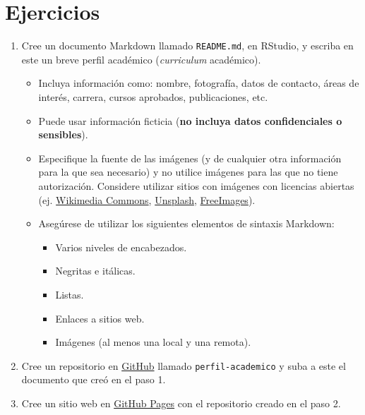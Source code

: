\documentclass[
  letterpaper,
  DIV=11,
  numbers=noendperiod]{scrreprt}
\providecommand{\tightlist}{%
  \setlength{\itemsep}{0pt}\setlength{\parskip}{0pt}}\usepackage{longtable,booktabs,array}
\begin{document}
\hypertarget{ejercicios}{%
\section{Ejercicios}\label{ejercicios}}

\begin{enumerate}
\def\labelenumi{\arabic{enumi}.}
\tightlist
\item
  Cree un documento Markdown llamado \texttt{README.md}, en RStudio, y
  escriba en este un breve perfil académico (\emph{curriculum}
  académico).

  \begin{itemize}
  \tightlist
  \item
    Incluya información como: nombre, fotografía, datos de contacto,
    áreas de interés, carrera, cursos aprobados, publicaciones, etc.
  \item
    Puede usar información ficticia (\textbf{no incluya datos
    confidenciales o sensibles}).
  \item
    Especifique la fuente de las imágenes (y de cualquier otra
    información para la que sea necesario) y no utilice imágenes para
    las que no tiene autorización. Considere utilizar sitios con
    imágenes con licencias abiertas (ej.
    \href{https://commons.wikimedia.org/}{Wikimedia Commons},
    \href{https://unsplash.com/}{Unsplash},
    \href{https://www.freeimages.com/}{FreeImages}).
  \item
    Asegúrese de utilizar los siguientes elementos de sintaxis Markdown:

    \begin{itemize}
    \tightlist
    \item
      Varios niveles de encabezados.
    \item
      Negritas e itálicas.
    \item
      Listas.
    \item
      Enlaces a sitios web.
    \item
      Imágenes (al menos una local y una remota).
    \end{itemize}
  \end{itemize}
\item
  Cree un repositorio en \href{https://github.com/}{GitHub} llamado
  \texttt{perfil-academico} y suba a este el documento que creó en el
  paso 1.
\item
  Cree un sitio web en \href{https://pages.github.com/}{GitHub Pages}
  con el repositorio creado en el paso 2.
\end{enumerate}
\end{document}
